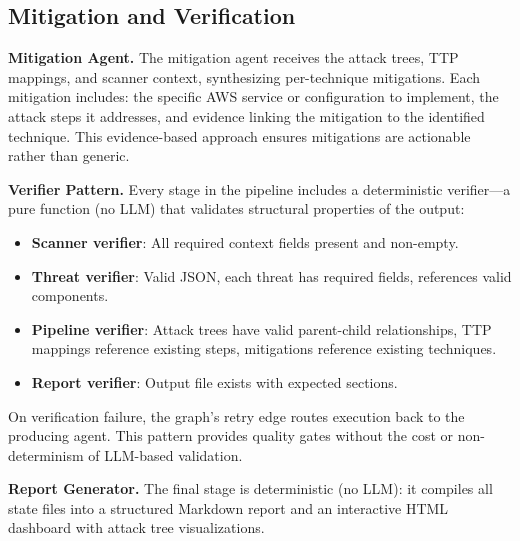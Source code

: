 \subsection{Mitigation and Verification}
\label{sec:mitigation}

\textbf{Mitigation Agent.} The mitigation agent receives the attack trees, TTP mappings, and scanner context, synthesizing per-technique mitigations. Each mitigation includes: the specific AWS service or configuration to implement, the attack steps it addresses, and evidence linking the mitigation to the identified technique. This evidence-based approach ensures mitigations are actionable rather than generic.

\textbf{Verifier Pattern.} Every stage in the pipeline includes a deterministic verifier---a pure function (no LLM) that validates structural properties of the output:

\begin{itemize}
    \item \textbf{Scanner verifier}: All required context fields present and non-empty.
    \item \textbf{Threat verifier}: Valid JSON, each threat has required fields, references valid components.
    \item \textbf{Pipeline verifier}: Attack trees have valid parent-child relationships, TTP mappings reference existing steps, mitigations reference existing techniques.
    \item \textbf{Report verifier}: Output file exists with expected sections.
\end{itemize}

On verification failure, the graph's retry edge routes execution back to the producing agent. This pattern provides quality gates without the cost or non-determinism of LLM-based validation.

\textbf{Report Generator.} The final stage is deterministic (no LLM): it compiles all state files into a structured Markdown report and an interactive HTML dashboard with attack tree visualizations.
